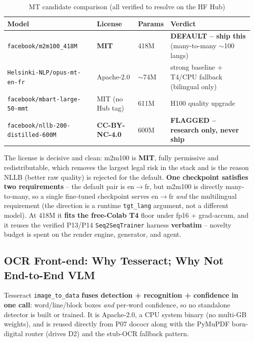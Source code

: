 \documentclass[12pt,a4paper]{article}
\begin{document}
\begin{table}[H]
\centering
\caption{MT candidate comparison (all verified to resolve on the HF Hub)}
\small
\begin{tabularx}{\linewidth}{@{} l l l L @{}}
\toprule
\textbf{Model} & \textbf{License} & \textbf{Params} & \textbf{Verdict} \\
\midrule
\texttt{facebook/m2m100\_418M} & \textbf{MIT} & 418M & \textbf{DEFAULT -- ship this} (many-to-many $\sim$100 langs) \\
\texttt{Helsinki-NLP/opus-mt-en-fr} & Apache-2.0 & $\sim$74M & strong baseline + T4/CPU fallback (bilingual only) \\
\texttt{facebook/mbart-large-50-mmt} & MIT (no Hub tag) & 611M & H100 quality upgrade \\
\texttt{facebook/nllb-200-distilled-600M} & \textbf{CC-BY-NC-4.0} & 600M & \textbf{FLAGGED -- research only, never ship} \\
\bottomrule
\end{tabularx}
\end{table}

The license is decisive and clean: m2m100 is \textbf{MIT}, fully permissive and redistributable, which removes the largest legal risk in the stack and is the reason NLLB (better raw quality) is rejected for the default. \textbf{One checkpoint satisfies two requirements} -- the default pair is en$\rightarrow$fr, but m2m100 is directly many-to-many, so a single fine-tuned checkpoint serves en$\rightarrow$fr \emph{and} the multilingual requirement (the direction is a runtime \texttt{tgt\_lang} argument, not a different model). At 418M it \textbf{fits the free-Colab T4} floor under fp16 + grad-accum, and it reuses the verified P13/P14 \texttt{Seq2SeqTrainer} harness \textbf{verbatim} -- novelty budget is spent on the render engine, generator, and agent.

\subsection{OCR Front-end: Why Tesseract; Why Not End-to-End VLM}

Tesseract \texttt{image\_to\_data} \textbf{fuses detection + recognition + confidence in one call}: word/line/block boxes \emph{and} per-word confidence, so no standalone detector is built or trained. It is Apache-2.0, a CPU system binary (no multi-GB weights), and is reused directly from P07 dococr along with the PyMuPDF born-digital router (drives D2) and the stub-OCR fallback pattern.
\end{document}
